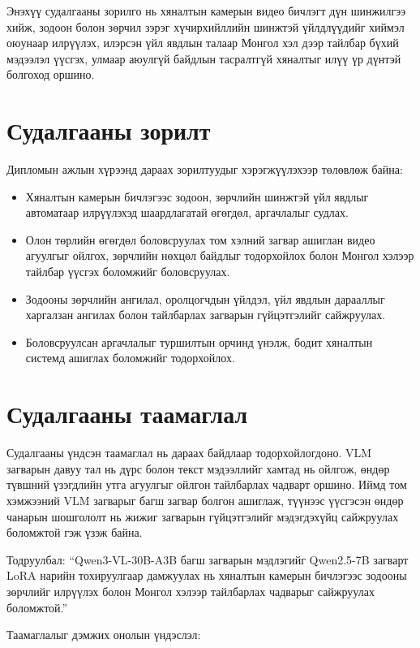 Энэхүү судалгааны зорилго нь хяналтын камерын видео бичлэгт дүн шинжилгээ хийж, зодоон болон зөрчил зэрэг хүчирхийллийн шинжтэй үйлдлүүдийг хиймэл оюунаар илрүүлэх, илэрсэн үйл явдлын талаар Монгол хэл дээр тайлбар бүхий мэдээлэл үүсгэх, улмаар аюулгүй байдлын тасралтгүй хяналтыг илүү үр дүнтэй болгоход оршино.

\section{Судалгааны зорилт}

Дипломын ажлын хүрээнд дараах зорилтуудыг хэрэгжүүлэхээр төлөвлөж байна:

\begin{itemize}
    \item Хяналтын камерын бичлэгээс зодоон, зөрчлийн шинжтэй үйл явдлыг автоматаар илрүүлэхэд шаардлагатай өгөгдөл, аргачлалыг судлах.
    \item Олон төрлийн өгөгдөл боловсруулах том хэлний загвар ашиглан видео агуулгыг ойлгох, зөрчлийн нөхцөл байдлыг тодорхойлох болон Монгол хэлээр тайлбар үүсгэх боломжийг боловсруулах.
    \item Зодооны зөрчлийн ангилал, оролцогчдын үйлдэл, үйл явдлын дарааллыг харгалзан ангилах болон тайлбарлах загварын гүйцэтгэлийг сайжруулах.
    \item Боловсруулсан аргачлалыг туршилтын орчинд үнэлж, бодит хяналтын системд ашиглах боломжийг тодорхойлох.
\end{itemize}

\section{Судалгааны таамаглал}

Судалгааны үндсэн таамаглал нь дараах байдлаар тодорхойлогдоно. VLM загварын давуу тал нь дүрс болон текст мэдээллийг хамтад нь ойлгож, өндөр түвшний үзэгдлийн утга агуулгыг ойлгон тайлбарлах чадварт оршино. Иймд том хэмжээний VLM загварыг багш загвар болгон ашиглаж, түүнээс үүсгэсэн өндөр чанарын шошгололт нь жижиг загварын гүйцэтгэлийг мэдэгдэхүйц сайжруулах боломжтой гэж үзэж байна.

Тодруулбал: ``Qwen3-VL-30B-A3B багш загварын мэдлэгийг Qwen2.5-7B загварт LoRA нарийн тохируулгаар дамжуулах нь хяналтын камерын бичлэгээс зодооны зөрчлийг илрүүлэх болон Монгол хэлээр тайлбарлах чадварыг сайжруулах боломжтой.''

Таамаглалыг дэмжих онолын үндэслэл:

